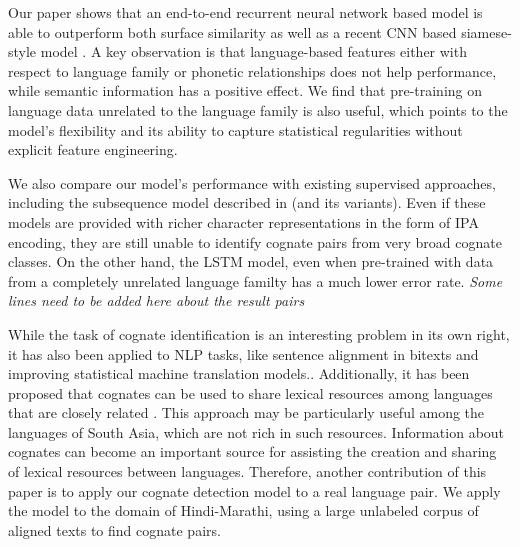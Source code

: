 \documentclass[11pt,letterpaper]{article}
\begin{document}

Our paper shows that an end-to-end recurrent neural network based model is able to outperform both surface similarity as well as a recent CNN based siamese-style model \cite{rama2016siamese}. A key observation is that language-based features either with respect to language family or phonetic relationships does not help performance, while semantic information has a positive effect. We find that pre-training on language data unrelated to the language family is also useful, which points to the model's flexibility and its ability to capture statistical regularities without explicit feature engineering.

We also compare our model's performance with existing supervised approaches, including the subsequence model described in \cite{rama2015automatic} (and its variants). Even if these models are provided with richer character representations in the form of IPA encoding, they are still unable to identify cognate pairs from very broad cognate classes. On the other hand, the LSTM model, even when pre-trained with data from a completely unrelated language familty has a much lower error rate.  \textit{Some lines need to be added here about the result pairs}



While the task of cognate identification is an interesting problem in its own right, it has also been applied to NLP tasks, like sentence alignment in bitexts and improving statistical machine translation models.\cite{Kondrak:2003,Simard:1993:UCA:962367.962411}. Additionally, it has been proposed that cognates can be used to share lexical resources among languages that are closely related \citep{Singh:07b}. This approach may be particularly useful among the languages of South Asia, which are not rich in such resources. Information about cognates can become an important source for assisting the creation and sharing of lexical resources between languages. Therefore, another contribution of this paper is to apply our cognate detection model to a real language pair. We apply the model to the domain of Hindi-Marathi, using a large unlabeled corpus of aligned texts to find cognate pairs.
\end{document}
